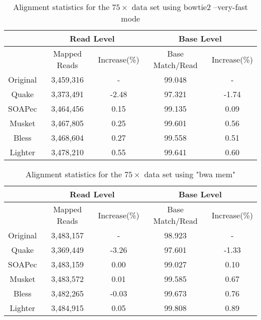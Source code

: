 \documentclass[10pt]{article}
\begin{document}
\begin{table}[h!] 
\caption{Alignment statistics for the $75\times$ \ecoli data set using bowtie2 --very-fast mode}
\begin{tabular}{|c|c|c||c|c|} \hline
	 & \multicolumn{2}{|c||}{Read Level} & \multicolumn{2}{|c|}{Base Level} \\ \hline
     & Mapped Reads & Increase(\%) & Base Match/Read & Increase(\%) \\ \hline
Original&	3,459,316&	-&	99.048&	-  \\ \hline 
Quake&	3,373,491&	-2.48&	97.321&	-1.74  \\ \hline
SOAPec&	3,464,456&	0.15&	99.135&	0.09  \\ \hline
Musket&	3,467,805&	0.25&	99.601&	0.56  \\ \hline
Bless&	3,468,604&	0.27&	99.558&	0.51	 \\ \hline
Lighter&	3,478,210&	0.55&	99.641&	0.60  \\ \hline
\end{tabular}
\end{table}

\begin{table}[h!] 
\caption{Alignment statistics for the $75\times$ \ecoli data set using "bwa mem"}
\begin{tabular}{|c|c|c||c|c|} \hline
	 & \multicolumn{2}{|c||}{Read Level} & \multicolumn{2}{|c|}{Base Level} \\ \hline
     & Mapped Reads & Increase(\%) & Base Match/Read & Increase(\%) \\ \hline
Original&	3,483,157&	-&	98.923&	- \\ \hline 
Quake&	3,369,449&	-3.26&	97.601&	-1.33 \\ \hline 
SOAPec&	3,483,159&	0.00&	99.027&	0.10 \\ \hline 
Musket&	3,483,572&	0.01&	99.585&	0.67 \\ \hline 
Bless&	3,482,265&	-0.03&	99.673&	0.76 \\ \hline 
Lighter&	3,484,915&	0.05&	99.808&	0.89 \\ \hline 
\end{tabular}
\end{table}



\end{document}
